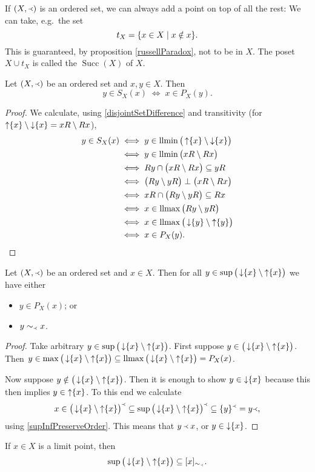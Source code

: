 If $\sSet{X,\Yleft}$ is an ordered set, we can always add a point on top of all the rest: We can take, e.g.\ the set
\[ t_X = \setbuilder{x\in X}{x\notin x}. \]
This is guaranteed, by proposition \ref{russellParadox}, not to be in $X$.
The poset $X\cup t_X$ is called the  $\operatorname{Succ}(X)$ of $X$.

\begin{proposition}
Let $\sSet{X,\Yleft}$ be an ordered set and $x,y\in X$. Then
\[ y \in S_X(x) \;\iff\; x\in P_X(y). \]
\end{proposition}
\begin{proof}
We calculate, using \ref{disjointSetDifference} and transitivity (for $\operatorname{\uparrow}\{x\}\setminus \operatorname{\downarrow}\{x\} = xR\setminus Rx$),
\begin{align*}
y \in S_X(x) &\iff y\in \operatorname{llmin}\big(\operatorname{\uparrow}\{x\}\setminus \operatorname{\downarrow}\{x\}\big) \\
&\iff y\in \operatorname{llmin}\big(xR\setminus Rx\big) \\
&\iff Ry \cap \big(xR\setminus Rx\big) \subseteq yR \\
&\iff \big(Ry\setminus yR\big) \perp \big(xR\setminus Rx\big) \\
&\iff xR \cap \big(Ry\setminus yR\big) \subseteq Rx \\
&\iff x\in \operatorname{llmax}\big(Ry\setminus yR\big) \\
&\iff x\in \operatorname{llmax}\big(\operatorname{\downarrow}\{y\}\setminus \operatorname{\uparrow}\{y\}\big) \\
&\iff x \in P_X(y).
\end{align*}
\end{proof}

\begin{lemma}
Let $\sSet{X,\Yleft}$ be an ordered set and $x\in X$. Then for all $y\in \sup\big(\operatorname{\downarrow}\{x\}\setminus \operatorname{\uparrow}\{x\}\big)$ we have either
\begin{itemize}
\item $y\in P_X(x)$; or
\item $y\sim_\Yleft x$.
\end{itemize}
\end{lemma}
\begin{proof}
Take arbitrary $y\in \sup\big(\operatorname{\downarrow}\{x\}\setminus \operatorname{\uparrow}\{x\}\big)$. First suppose $y\in\big(\operatorname{\downarrow}\{x\}\setminus \operatorname{\uparrow}\{x\}\big)$. Then $y\in \max\big(\operatorname{\downarrow}\{x\}\setminus \operatorname{\uparrow}\{x\}\big) \subseteq \operatorname{llmax}\big(\operatorname{\downarrow}\{x\}\setminus \operatorname{\uparrow}\{x\}\big) = P_X(x)$.


Now suppose $y\notin\big(\operatorname{\downarrow}\{x\}\setminus \operatorname{\uparrow}\{x\}\big)$. Then it is enough to show $y\in \operatorname{\downarrow}\{x\}$ because this then implies $y\in \operatorname{\uparrow}\{x\}$. To this end we calculate
\[ x\in \big(\operatorname{\downarrow}\{x\}\setminus \operatorname{\uparrow}\{x\}\big)^\Yleft \subseteq \sup\big(\operatorname{\downarrow}\{x\}\setminus \operatorname{\uparrow}\{x\}\big)^\Yleft \subseteq \{y\}^\Yleft = y{\Yleft}, \]
using \ref{supInfPreserveOrder}. This means that $y \Yleft x$, or $y\in \operatorname{\downarrow}\{x\}$.
\end{proof}
\begin{corollary} \label{supLesserElementsOfLimitPoint}
If $x\in X$ is a limit point, then
\[ \sup\big(\operatorname{\downarrow}\{x\}\setminus \operatorname{\uparrow}\{x\}\big) \subseteq [x]_{\sim_\Yleft}. \]
\end{corollary}


